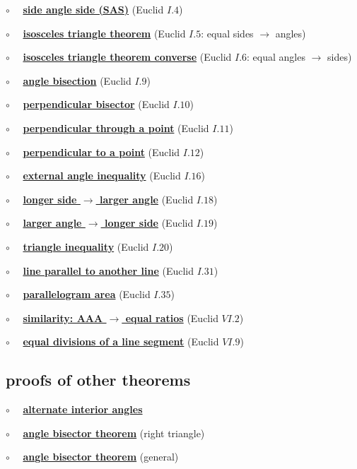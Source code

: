 \documentclass[11pt, oneside]{article}
\begin{document}
$\circ$ \ \ \hyperref[sec:Euclid4]{\textbf{side angle side (SAS)}} (Euclid $I.4$)

$\circ$ \ \ \hyperref[sec:Euclid5]{\textbf{isosceles triangle theorem}} (Euclid $I.5$:  equal sides $\rightarrow$ angles)

$\circ$ \ \ \hyperref[sec:Euclid6]{\textbf{isosceles triangle theorem converse}} (Euclid $I.6$:  equal angles $\rightarrow$ sides)

$\circ$ \ \ \hyperref[sec:Euclid9]{\textbf{angle bisection}} (Euclid $I.9$)

$\circ$ \ \ \hyperref[sec:Euclid10]{\textbf{perpendicular bisector}} (Euclid $I.10$)

$\circ$ \ \ \hyperref[sec:Euclid11]{\textbf{perpendicular through a point}} (Euclid $I.11$)

$\circ$ \ \ \hyperref[sec:Euclid12]{\textbf{perpendicular to a point}} (Euclid $I.12$)

$\circ$ \ \ \hyperref[sec:Euclid16]{\textbf{external angle inequality}} (Euclid $I.16$)

$\circ$ \ \ \hyperref[sec:Euclid18]{\textbf{longer side $\rightarrow$ larger angle}}  (Euclid $I.18$)

$\circ$ \ \ \hyperref[sec:Euclid19]{\textbf{larger angle $\rightarrow$ longer side}} (Euclid $I.19$)

$\circ$ \ \ \hyperref[sec:triangle_inequality]{\textbf{triangle inequality}} (Euclid $I.20$)

$\circ$ \ \ \hyperref[sec:Euclid31]{\textbf{line parallel to another line}} (Euclid $I.31$)

$\circ$ \ \ \hyperref[sec:Euclid_I_35]{\textbf{parallelogram area}} (Euclid $I.35$)

$\circ$ \ \ \hyperref[sec:Euclid6_2]{\textbf{similarity:  AAA $\rightarrow$ equal ratios}} (Euclid $VI.2$)

$\circ$ \ \ \hyperref[sec:Euclid6_9]{\textbf{equal divisions of a line segment}} (Euclid $VI.9$)


\subsection*{proofs of other theorems}

$\circ$ \ \  \hyperref[sec:alternate_interior_angle_theorem]{\textbf{alternate interior angles}}

$\circ$ \ \ \hyperref[sec:angle_bisector_theorem]{\textbf{angle bisector theorem}} (right triangle)

$\circ$ \ \ \hyperref[sec:generalized_angle_bisector_theorem]{\textbf{angle bisector theorem}} (general)
\end{document}
